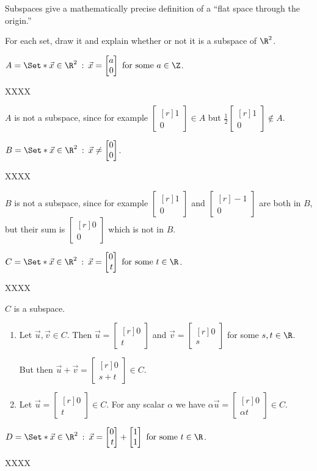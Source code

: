 \documentclass{problemset}
\newcommand{\mat}[1]{\begin{bmatrix*}[r]#1\end{bmatrix*}}
\providecommand\given{}
\newcommand\SetSymbol[1][]{%
	\nonscript\::%
	\allowbreak
	\nonscript\:
	\mathopen{}}
\renewcommand\given{\SetSymbol[\delimsize]}
\begin{document}
	Subspaces give a mathematically precise definition of a ``flat space through the origin.''

	\question
	For each set, draw it and explain whether or not it is a subspace of $\R^2$.
	\begin{parts}
		\item $A=\Set*{\vec x\in\R^2 \given \vec x=\mat{a\\0}\text{ for some }a\in\Z}$.
			\begin{solution}
				XXXX

				$A$ is not a subspace, since for example $\mat{1\\0} \in A$ but 
				$\frac{1}{2}\mat{1\\0}\notin A$. 
			\end{solution}
		\item $B=\Set*{\vec x\in\R^2 \given \vec x\neq \mat{0\\0}}$.
			\begin{solution}
				XXXX
					
				$B$ is not a subspace, since for example $\mat{1\\0}$ and $\mat{-1\\0}$
				are both in $B$, but their sum is $\mat{0\\0}$ which is not in $B$.
			\end{solution}
		\item $C=\Set*{\vec x\in\R^2 \given \vec x=\mat{0\\t}\text{ for some }t\in\R}$.
			\begin{solution}
				XXXX
					
				$C$ is a subspace.

				\begin{enumerate}[label=(\roman*)]
					\item Let $\vec u,\vec v\in C$. Then $\vec u=\mat{0\\t}$ and
						$\vec v=\mat{0\\s}$ for some $s,t\in\R$.

						But then $\vec u+\vec v=\mat{0\\s+t}\in C$. 
					\item Let $\vec u=\mat{0\\t}\in C$. For any scalar $\alpha$
						we have $\alpha\vec u=\mat{0\\\alpha t}\in C$. 
				\end{enumerate}
			\end{solution}
		\item $D=\Set*{\vec x\in\R^2 \given \vec x=\mat{0\\t}+\mat{1\\1}\text{ for some }t\in\R}$.
			\begin{solution}
				XXXX
					

\end{solution}
\end{parts}
\end{document}
